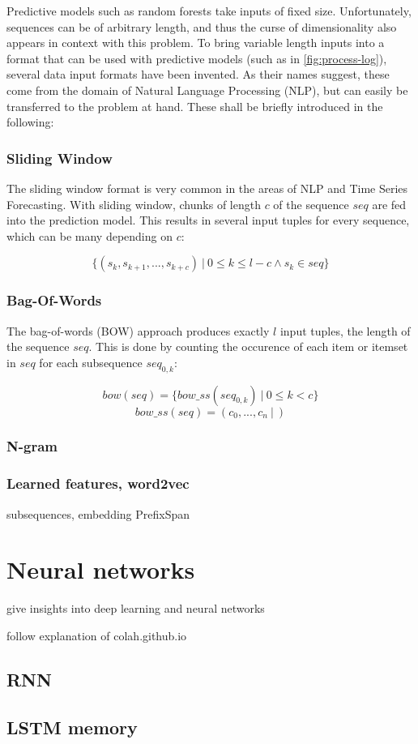 Predictive models such as random forests take inputs of fixed size. Unfortunately, sequences can be of arbitrary length, and thus the curse of dimensionality also appears in context with this problem. To bring variable length inputs into a format that can be used with predictive models (such as in \autoref{fig:process-log}), several data input formats have been invented. As their names suggest, these come from the domain of Natural Language Processing (NLP), but can easily be transferred to the problem at hand. These shall be briefly introduced in the following:

\subsubsection{Sliding Window}
The sliding window format is very common in the areas of NLP and Time Series Forecasting. With sliding window, chunks of length $c$ of the sequence $seq$ are fed into the prediction model. This results in several input tuples for every sequence, which can be many depending on $c$:

\begin{equation}
    \{ (s_k, s_{k+1}, ..., s_{k+c})\ |\ 0 \leq k \leq l-c \wedge s_k \in seq \}
\end{equation}

\subsubsection{Bag-Of-Words}
The bag-of-words (BOW) approach produces exactly $l$ input tuples, the length of the sequence $seq$. This is done by counting the occurence of each item or itemset in $seq$ for each subsequence $seq_{0,k}$:


\begin{equation}
    bow(seq) = \{ bow\_ss(seq_{0,k})\ |\ 0 \leq k < c \}
\end{equation}
\begin{equation}
    bow\_ss(seq) = ( c_0, ..., c_n\ | \ )
\end{equation}

\subsubsection{N-gram}

\subsubsection{Learned features, word2vec}
subsequences, embedding
PrefixSpan

\section{Neural networks}
give insights into deep learning and neural networks 

follow explanation of colah.github.io

\subsection{RNN}
\subsection{LSTM memory}